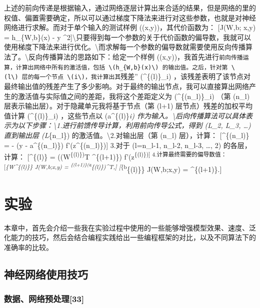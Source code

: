 上述的前向传递是根据输入，通过网络逐层计算出来合适的结果，但是网络的里的权值、偏置需要确定，所以可以通过梯度下降法来进行对这些参数，也就是对神经网络进行求解。而对于单个输入的测试样例
((x,y))，其代价函数为： {[}J(W,b; x,y) = 
\textbar{}\textbar{} h\_\{W,b\}(x) - y
\textbar{}\textbar{}\^{}2{]}\textbackslash{}只要得到每一个参数的关于代价函数的偏导数，我就可以使用梯度下降法来进行优化。\textbackslash{}而求解每一个参数的偏导数就需要使用反向传播算法了。\textbackslash{}反向传播算法的思路如下：给定一个样例
((x,y))，我首先进行\texttt{前向传播\textquotesingle{}\textquotesingle{}运算，计算出网络中所有的激活值，包括\ \textbackslash{}(h\_\{W,b\}(x)\textbackslash{})\ 的输出值。之后，针对第\ \textbackslash{}(l\textbackslash{})\ 层的每一个节点\ \textbackslash{}(i\textbackslash{})，我计算出其}残差''
(\delta\^{}\{(l)\}\_i)
，该残差表明了该节点对最终输出值的残差产生了多少影响。对于最终的输出节点，我可以直接算出网络产生的激活值与实际值之间的差距，我将这个差距定义为
(\delta\^{}\{(n\_l)\}\_i) （第 (n\_l)
层表示输出层）。对于隐藏单元我将基于节点（第 (l+1)
层节点）残差的加权平均值计算 (\delta\^{}\{(l)\}\_i) ，这些节点以
(a\^{}\{(l)\}\emph{i)
作为输入。\textbackslash{}后向传播算法可以具体表示为以下步骤：\textbackslash{}1.进行前馈传导计算，利用前向传导公式，得到
(L\_2, L\_3, \ldots) 直到输出层 (L}\{n\_l\})
的激活值。\textbackslash{}2.对输出层（第 (n\_l) 层），计算：
{[}\delta\^{}\{(n\_l)\} = - (y - a\^{}\{(n\_l)\})
\bullet f'(z\^{}\{(n\_l)\}){]} 3.对于 (l=n\_l-1, n\_l-2, n\_l-3, \ldots,
2) 的各层，计算： {[}\delta\^{}\{(l)\} =
\left((W\textsuperscript{\{(l)\})}T \delta\^{}\{(l+1)\}\right)
\bullet f'(z\textsuperscript{\{(l)\}){]} 4.计算最终需要的偏导数值：
{[}\nabla\emph{\{W\^{}\{(l)\}\} J(W,b;x,y) =
\delta\textsuperscript{\{(l+1)\}(a}\{(l)\})\^{}T,{]}
{[}\nabla}\{b}\{(l)\}\} J(W,b;x,y) = \delta\^{}\{(l+1)\}.{]}

\section{实验}\label{ux5b9eux9a8c}

本章中，首先会介绍一些我在实验过程中使用的一些能够增强模型效果、速度、泛化能力的技巧，然后会结合编程实践给出一些编程框架的对比，以及不同算法下的准确率的比较。

\subsection{神经网络使用技巧}\label{ux795eux7ecfux7f51ux7edcux4f7fux7528ux6280ux5de7}

\subsubsection{数据、网络预处理{[}33{]}}\label{ux6570ux636eux7f51ux7edcux9884ux5904ux7406lecun2012}


